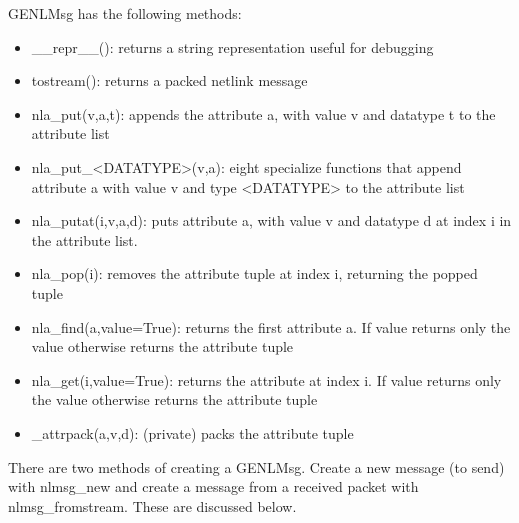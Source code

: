 \documentclass[11pt]{article}
\begin{document}
\begin{appendices}
GENLMsg has the following methods:
\begin{itemize}
\item \_\_repr\_\_(): returns a string representation useful for debugging
\item tostream(): returns a packed netlink message
\item nla\_put(v,a,t): appends the attribute a, with value v and datatype t to
the attribute list
\item nla\_put\_<DATATYPE>(v,a): eight specialize functions that append attribute
a with value v and type <DATATYPE> to the attribute list
\item nla\_putat(i,v,a,d): puts attribute a, with value v and datatype d at
index i in the attribute list.
\item nla\_pop(i): removes the attribute tuple at index i, returning the popped
tuple
\item nla\_find(a,value=True): returns the first attribute a. If value returns only
the value otherwise returns the attribute tuple
\item nla\_get(i,value=True): returns the attribute at index i. If value returns only
the value otherwise returns the attribute tuple
\item \_attrpack(a,v,d): (private) packs the attribute tuple 
\end{itemize}

There are two methods of creating a GENLMsg. Create a new message (to send) with nlmsg\_new and create a message from a received packet with nlmsg\_fromstream. These
are discussed below.


\end{appendices}
\end{document}
